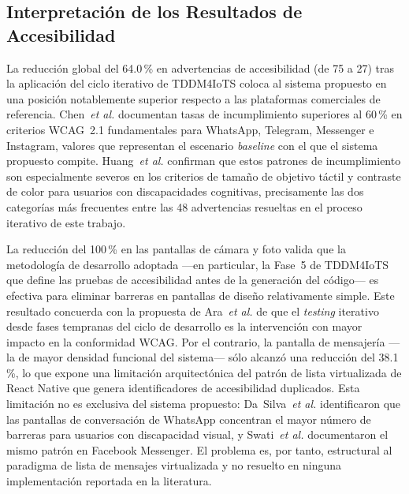 \documentclass[journal]{IEEEtran}
\begin{document}
	\subsection{Interpretaci\'on de los Resultados de Accesibilidad}
	La reducci\'on global del 64.0\,\% en advertencias de accesibilidad (de 75 a 27) tras la aplicaci\'on del ciclo iterativo de TDDM4IoTS coloca al sistema propuesto en una posici\'on notablemente superior respecto a las plataformas comerciales de referencia. Chen~\textit{et al.} \cite{chen2022} documentan tasas de incumplimiento superiores al 60\,\% en criterios WCAG~2.1 fundamentales para WhatsApp, Telegram, Messenger e Instagram, valores que representan el escenario \textit{baseline} con el que el sistema propuesto compite. Huang~\textit{et al.} \cite{huang2025} confirman que estos patrones de incumplimiento son especialmente severos en los criterios de tama\~no de objetivo t\'actil y contraste de color para usuarios con discapacidades cognitivas, precisamente las dos categor\'ias m\'as frecuentes entre las 48 advertencias resueltas en el proceso iterativo de este trabajo.
	
	La reducci\'on del 100\,\% en las pantallas de c\'amara y foto valida que la metodolog\'ia de desarrollo adoptada ---en particular, la Fase~5 de TDDM4IoTS que define las pruebas de accesibilidad antes de la generaci\'on del c\'odigo--- es efectiva para eliminar barreras en pantallas de dise\~no relativamente simple. Este resultado concuerda con la propuesta de Ara~\textit{et al.} \cite{ara2024} de que el \textit{testing} iterativo desde fases tempranas del ciclo de desarrollo es la intervenci\'on con mayor impacto en la conformidad WCAG. Por el contrario, la pantalla de mensajer\'ia ---la de mayor densidad funcional del sistema--- s\'olo alcanz\'o una reducci\'on del 38.1\,\%, lo que expone una limitaci\'on arquitect\'onica del patr\'on de lista virtualizada de React Native que genera identificadores de accesibilidad duplicados. Esta limitaci\'on no es exclusiva del sistema propuesto: Da~Silva~\textit{et al.} \cite{dasilva2016} identificaron que las pantallas de conversaci\'on de WhatsApp concentran el mayor n\'umero de barreras para usuarios con discapacidad visual, y Swati~\textit{et al.} \cite{swati2021} documentaron el mismo patr\'on en Facebook Messenger. El problema es, por tanto, estructural al paradigma de lista de mensajes virtualizada y no resuelto en ninguna implementaci\'on reportada en la literatura.
	
\end{document}
